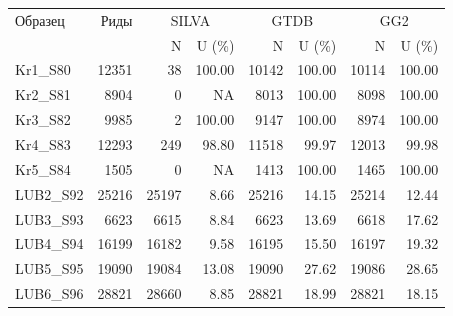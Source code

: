 \begin{tabular}{lrrrrrrr}
\hline
Образец & Риды & \multicolumn{2}{c}{SILVA} & \multicolumn{2}{c}{GTDB} & \multicolumn{2}{c}{GG2} \\
 & & N & U (\%) & N & U (\%) & N & U (\%) \\
\hline
Kr1\_S80 & 12351 & 38 & 100.00 & 10142 & 100.00 & 10114 & 100.00 \\
Kr2\_S81 & 8904 & 0 & NA & 8013 & 100.00 & 8098 & 100.00 \\
Kr3\_S82 & 9985 & 2 & 100.00 & 9147 & 100.00 & 8974 & 100.00 \\
Kr4\_S83 & 12293 & 249 & 98.80 & 11518 & 99.97 & 12013 & 99.98 \\
Kr5\_S84 & 1505 & 0 & NA & 1413 & 100.00 & 1465 & 100.00 \\
LUB2\_S92 & 25216 & 25197 & 8.66 & 25216 & 14.15 & 25214 & 12.44 \\
LUB3\_S93 & 6623 & 6615 & 8.84 & 6623 & 13.69 & 6618 & 17.62 \\
LUB4\_S94 & 16199 & 16182 & 9.58 & 16195 & 15.50 & 16197 & 19.32 \\
LUB5\_S95 & 19090 & 19084 & 13.08 & 19090 & 27.62 & 19086 & 28.65 \\
LUB6\_S96 & 28821 & 28660 & 8.85 & 28821 & 18.99 & 28821 & 18.15 \\
\hline
\end{tabular}
